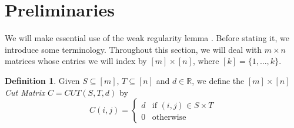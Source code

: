 \documentclass[final, 12pt]{colt2018}
\newcommand{\R}{\mathbb{R}}
\newcommand{\vnote}[1]{\textcolor{red}{\small {\textbf{(Vishesh: }#1\textbf{) }}}}
\newtheorem{defn}[theorem]{Definition}
\theoremstyle{definition}
\newtheorem{defn}[theorem]{Definition}
\theoremstyle{plain}
\begin{document}
\begin{comment}
On the other hand, given such a decomposition of the graph, it is
readily seen that \emph{all} states which have approximately the same
number of $+1$ spins in each block contribute approximately the same
to the partition function. We emphasize here that \emph{where }the
$+1$ spins occur in each block does not matter \textendash{} only
their total number does. Moreover, since we are interested in only
approximating the (log) partition function anyway, even knowing the
fraction of $+1$ spins in each block with some constant precision
is already enough. Since there are only a constant number of blocks
to start with, we see that we now have a constant sized problem. 
\vnote{TO DO} 
\end{comment}



\section{Preliminaries}

We will make essential use of the weak regularity lemma \citep{frieze-kannan-matrix}. Before stating
it, we introduce some terminology. Throughout this section, we will
deal with $m\times n$ matrices whose entries we will index by $[m]\times[n]$,
where $[k]=\{1,\dots,k\}$. 
\begin{defn}
Given $S\subseteq[m]$, $T\subseteq[n]$ and $d\in\R$, we define
the $[m]\times[n]$ \emph{Cut Matrix }$C=CUT(S,T,d)$ by 
\[
C(i,j)=\begin{cases}
d & \text{if }(i,j)\in S\times T\\
0 & \text{otherwise}
\end{cases}
\]
\end{defn}
\end{document}
